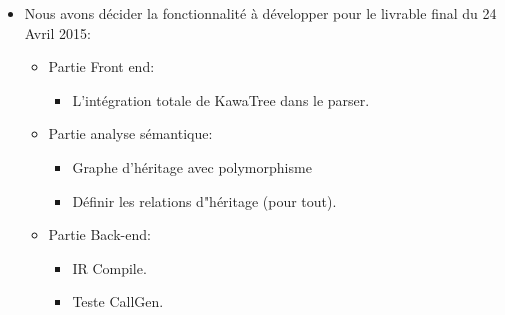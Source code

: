\documentclass{../../../../../res/rapport}
\begin{document}
\begin{itemize}
\begin{itemize}
	   \end{itemize}

	  \item Nous avons décider la fonctionnalité à développer pour le livrable final du 24 Avril 2015:
            \begin{itemize}
        	\item Partie Front end:
 			\begin{itemize}
        			\item L'intégration totale de KawaTree dans le parser. 
        		\end{itemize}
		\item Partie analyse sémantique:
			\begin{itemize}
        			\item Graphe d'héritage avec polymorphisme
				\item Définir les relations d"héritage (pour tout).		
        		\end{itemize}
		\item Partie Back-end: 
			\begin{itemize}
        			\item IR Compile.
				\item Teste CallGen. 					
        		\end{itemize}
	   \end{itemize}
   \end{itemize} 		
\end{document}
